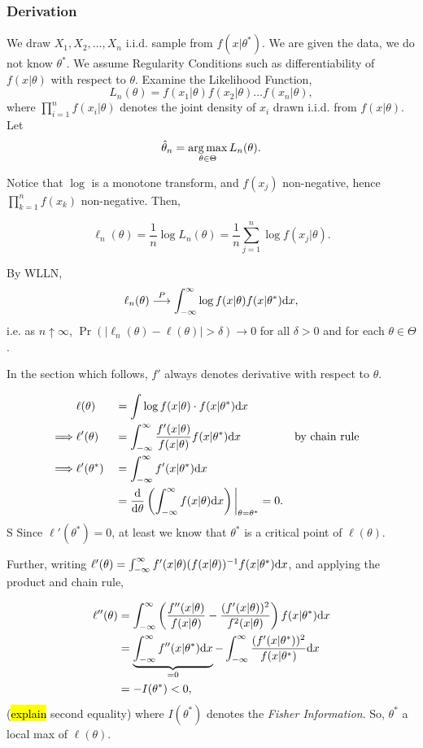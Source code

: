 \documentclass[12pt]{article}\usepackage[]{graphicx}\usepackage[]{color}
\begin{document}
\subsubsection{Derivation}
We draw $X_1, X_2, \ldots, X_n$ i.i.d. sample from $f(x|\theta^*)$.
We are given the data, we do not know $\theta^*$.
We assume Regularity Conditions such as differentiability of 
$f(x|\theta)$ with respect to $\theta$.
Examine the Likelihood Function,
\[
L_n(\theta) = f(x_1|\theta) f(x_2|\theta) \ldots f(x_n|\theta),
\]
where $\prod_{i=1}^nf(x_i|\theta)$ denotes the joint density of 
$x_i$ drawn i.i.d. from $f(x|\theta)$. Let 
\[
\hat \theta_n = \operatorname*{arg\,max}_{\theta \in \Theta} L_n(\theta).
\]

Notice that $\log$ is a monotone transform, and $f(x_j)$ non-negative,
hence $\prod_{k=1}^n f(x_k)$ non-negative. Then,

\[
\ell_n(\theta) = \frac{1}{n} \log L_n (\theta) = \frac{1}{n} \sum_{j=1}^n \log f(x_j|\theta).
\]

By WLLN,
\[
\ell_n(\theta) \overset{P}{\longrightarrow} \int_{-\infty}^\infty \log f(x|\theta) f(x|\theta^*) \mathrm{d} x,
\]
i.e. as $n \uparrow \infty$, $\Pr(|\ell_n (\theta) - \ell(\theta)| > \delta) \longrightarrow 0$ for all $\delta > 0$ and for each $\theta \in \Theta$.

In the section which follows, $f'$ always denotes derivative with 
respect to $\theta$.

\begin{alignat*}{5}
&\ell(\theta) &&= \int \log f(x|\theta) \cdot f(x|\theta^*) \mathrm{d} x \\
\implies &\ell '(\theta) &&= \int_{-\infty}^\infty \frac{f'(x|\theta)}{f(x|\theta)} f(x|\theta^*) \mathrm{d} x &&\textrm{by chain rule} \\
\implies &\ell '(\theta^*) &&= \int_{-\infty}^\infty f'(x|\theta^*) \mathrm{d} x \\
&                 &&= \frac{\mathrm{d}}{\mathrm{d} \theta} \left( \int_{-\infty}^\infty f(x|\theta) \mathrm{d} x \right) \bigg|_{\theta = \theta^*} = 0. \end{alignat*}
S
Since $\ell'(\theta^*) = 0$, at least we know that $\theta^*$ is a 
critical point of $\ell(\theta)$.

Further, writing $\ell'(\theta) = \int_{-\infty}^\infty f'(x|\theta) (f(x|\theta))^{-1} f(x|\theta^*) \mathrm{d} x$, and applying the product and chain rule,

\begin{align*}   \ell ''(\theta) &= \int_{-\infty}^\infty \left( \frac{f''(x|\theta)}{f(x|\theta)} - \frac{(f'(x|\theta))^2}{f^2(x|\theta)} \right) f(x|\theta^*) \mathrm{d} x \\
                 &= \underbrace{ \int_{-\infty}^\infty f''(x|\theta^*) \mathrm{d} x}_{=0} - \int_{-\infty}^\infty \frac{(f'(x|\theta^*))^2}{f(x|\theta^*)} \mathrm{d} x\\
                 &= -I(\theta^*) < 0, \end{align*}
(\hl{explain} second equality)
where $I(\theta^*)$ denotes the \emph{Fisher Information}. So,
$\theta^*$ a local max of $\ell (\theta)$.
\end{document}

